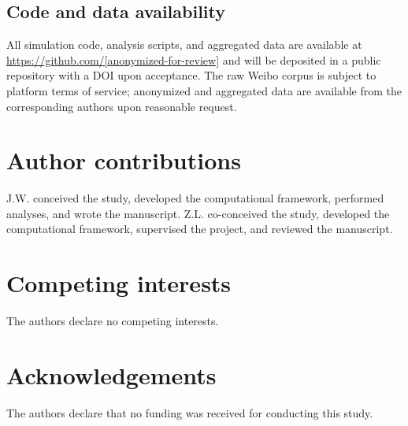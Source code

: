 \documentclass[12pt]{article}
\begin{document}
\subsection{Code and data availability}
All simulation code, analysis scripts, and aggregated data are available at \url{https://github.com/[anonymized-for-review]} and will be deposited in a public repository with a DOI upon acceptance. The raw Weibo corpus is subject to platform terms of service; anonymized and aggregated data are available from the corresponding authors upon reasonable request.

\FloatBarrier


\section*{Author contributions}
J.W. conceived the study, developed the computational framework, performed analyses, and wrote the manuscript.
Z.L. co-conceived the study, developed the computational framework, supervised the project, and reviewed the manuscript.

\section*{Competing interests}
The authors declare no competing interests.

\section*{Acknowledgements}
The authors declare that no funding was received for conducting this study.



\end{document}
